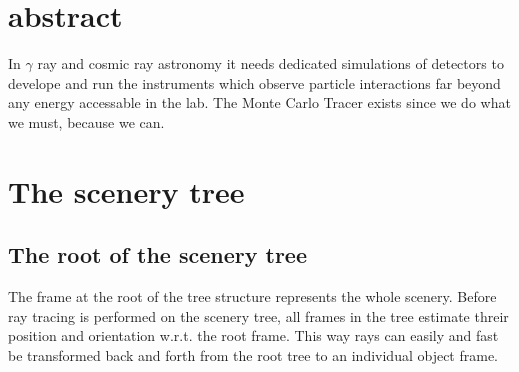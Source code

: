 \documentclass[11pt,a4paper,oneside,titlepage]{book}
\begin{document}
\newpage
\tableofcontents
\cleardoublepage
%
\setcounter{page}{0}
%
\chapter{abstract}
%
In $\gamma$ ray and cosmic ray astronomy it needs dedicated simulations of detectors to develope and run the instruments which observe particle interactions far beyond any energy accessable in the lab.
%
The Monte Carlo Tracer exists since we do what we must, because we can.
\chapter{The scenery tree}
\blindtext[2]
\section{The root of the scenery tree}
\label{SubSecRootFrame}
The frame at the root of the tree structure represents the whole scenery.
%
Before ray tracing is performed on the scenery tree, all frames in the tree estimate threir position and orientation w.r.t. the root frame.
%
This way rays can easily and fast be transformed back and forth from the root tree to an individual object frame.
\end{document}
